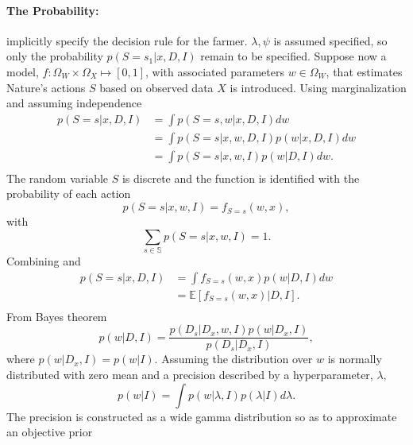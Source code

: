 \begin{example}
	\paragraph{The Probability:}  implicitly specify the decision rule for the farmer. $\lambda,\psi$ is assumed specified, so only the probability $p(S= s_1|x,D,I)$ remain to be specified. Suppose now a model, $f: \Omega_W\times \Omega_X\mapsto[0,1]$, with associated parameters $w\in \Omega_W$, that estimates Nature's actions $S$ based on observed data $X$ is introduced. Using marginalization and assuming independence 
	\begin{equation}
		\begin{split}
			p(S= s|x,D,I) &= \int p(S= s,w|x,D,I) dw \\
			& = \int p(S= s|x,w,D,I)  p(w|x,D,I)dw \\
			& = \int p(S= s|x,w,I)  p(w|D,I)dw. \\
		\end{split}
		\label{eq:q5}
	\end{equation}
	The random variable $S$ is discrete and the function is identified with the probability of each action
	\begin{equation}
		p(S = s|x,w,I)= f_{S = s}(w,x),
		\label{f_dist2}
	\end{equation}
	with
	\begin{equation}
		\sum_{s\in\mathbb{S}} p(S = s|x,w,I) = 1.
	\end{equation}
	Combining  and 
	\begin{equation}
		\begin{split}
			p(S= s|x,D,I) & = \int f_{S = s}(w,x)  p(w|D,I)dw \\
			& = \mathbb{E}[f_{S = s}(w,x)|D,I].\\
		\end{split}
	\end{equation}
	From Bayes theorem 
	\begin{equation}
		p(w|D,I) =\frac{p(D_s|D_x,w,I)p(w|D_x,I)}{p(D_s|D_x,I)},
	\end{equation}
	where $p(w|D_x,I) = p(w|I)$. Assuming the distribution over $w$ is normally distributed with zero mean and a precision described by a hyperparameter, $\lambda$, 
	\begin{equation}
		p(w|I) = \int p(w|\lambda,I)p(\lambda|I)d\lambda.
		\label{eq:lambda}
	\end{equation}
	The precision is constructed as a wide gamma distribution so as to approximate an objective prior

\end{example}

